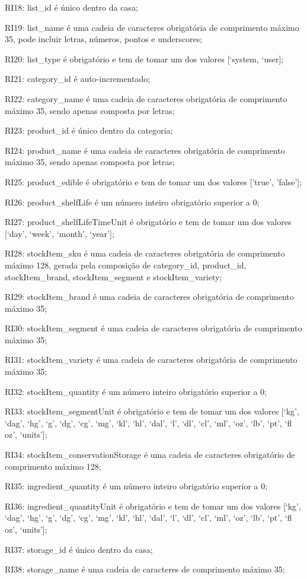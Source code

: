\begin{description}
	\item RI18: list\_id é único dentro da casa;
	\item RI19: list\_name é uma cadeia de caracteres obrigatória de comprimento máximo 35, pode incluir letras, números, pontos e underscores;
	\item RI20: list\_type é obrigatório e tem de tomar um dos valores [‘system, ‘user];
	\item RI21: category\_id é auto-incrementado;
	\item RI22: category\_name é uma cadeia de caracteres obrigatória de comprimento máximo 35, sendo apenas composta por letras;
	\item RI23: product\_id é único dentro da categoria;
	\item RI24: product\_name é uma cadeia de caracteres obrigatória de comprimento máximo 35, sendo apenas composta por letras;
	\item RI25: product\_edible é obrigatório e tem de tomar um dos valores ['true', 'false'];
	\item RI26: product\_shelfLife é um número inteiro obrigatório superior a 0;
	\item RI27: product\_shelfLifeTimeUnit é obrigatório e tem de tomar um dos valores [‘day’, ‘week’, ‘month’, ‘year’];
	\item RI28: stockItem\_sku é uma cadeia de caracteres obrigatória de comprimento máximo 128, gerada pela composição de category\_id, product\_id, stockItem\_brand, stockItem\_segment e stockItem\_variety;
	\item RI29: stockItem\_brand é uma cadeia de caracteres obrigatória de comprimento máximo 35;
	\item RI30: stockItem\_segment é uma cadeia de caracteres obrigatória de comprimento máximo 35;
	\item RI31: stockItem\_variety é uma cadeia de caracteres obrigatória de comprimento máximo 35;
	\item RI32: stockItem\_quantity é um número inteiro obrigatório superior a 0;
	\item RI33: stockItem\_segmentUnit é obrigatório e tem de tomar um dos valores [‘kg’, ‘dag’, ‘hg’, ‘g’, ‘dg’, ‘cg’, ‘mg’, ‘kl’, ‘hl’, ‘dal’, ‘l’, ‘dl’, ‘cl’, ‘ml’, ‘oz’, ‘lb’, ‘pt’, ‘fl oz’, ‘units’];
	\item RI34: stockItem\_conservationStorage é uma cadeia de caracteres obrigatório de comprimento máximo 128;
	\item RI35: ingredient\_quantity é um número inteiro obrigatório superior a 0;
	\item RI36: ingredient\_quantityUnit é obrigatório e tem de tomar um dos valores [‘kg’, ‘dag’, ‘hg’, ‘g’, ‘dg’, ‘cg’, ‘mg’, ‘kl’, ‘hl’, ‘dal’, ‘l’, ‘dl’, ‘cl’, ‘ml’, ‘oz’, ‘lb’, ‘pt’, ‘fl oz’, ‘units’];
	\item RI37: storage\_id é único dentro da casa;
	\item RI38: storage\_name é uma cadeia de caracteres de comprimento máximo 35;
\end{description}

